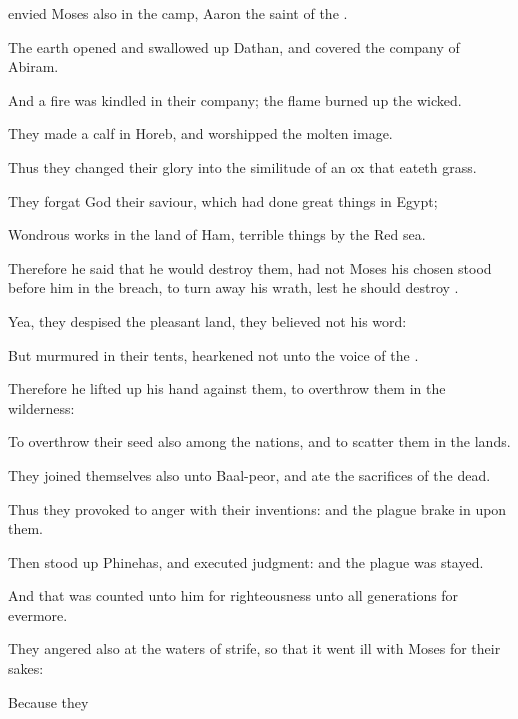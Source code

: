 {envied
Moses also in the
camp,
{}
Aaron the
saint of the
{}.
\par }{\Q {}The
earth
opened and swallowed
up
Dathan, and
covered the
company of
Abiram.
\par }{\Q {}And a
fire was
kindled in their
company; the
flame burned
up the
wicked.
\par }{\Q {}They
made a
calf in
Horeb, and
worshipped the molten
image.
\par }{\Q {}Thus they
changed their
glory into the
similitude of an
ox that
eateth
grass.
\par }{\Q {}They
forgat
God their
saviour, which had
done great
things in
Egypt;
\par }{\Q {}Wondrous
works in the
land of
Ham,
{} terrible
things by the
Red
sea.
\par }{\Q {}Therefore he
said that he would
destroy them, had
not
Moses his
chosen
stood
before him in the
breach, to turn
away his
wrath, lest he should
destroy
{}.
\par }{\Q {}Yea, they
despised the
pleasant
land, they
believed not his
word:
\par }{\Q {}But
murmured in their
tents,
{}
hearkened not unto the
voice of the
{}.
\par }{\Q {}Therefore he lifted
up his
hand against them, to
overthrow them in the
wilderness:
\par }{\Q {}To
overthrow their
seed also among the
nations, and to
scatter them in the
lands.
\par }{\Q {}They
joined themselves also unto
Baal-peor, and
ate the
sacrifices of the
dead.
\par }{\Q {}Thus they provoked
{} to
anger with their
inventions: and the
plague brake
in upon them.
\par }{\Q {}Then stood
up
Phinehas, and executed
judgment: and
{} the
plague was
stayed.
\par }{\Q {}And that was
counted unto him for
righteousness unto
all
generations
for
evermore.
\par }{\Q {}They
angered
{} also at the
waters of
strife, so that it went
ill with
Moses for their sakes:
\par }{\Q {}Because they
}
